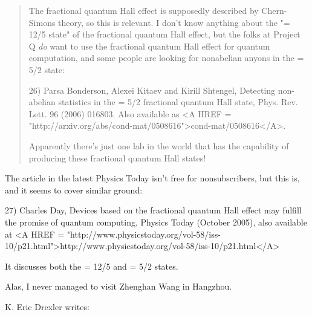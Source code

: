 \begin{quote}
The fractional quantum Hall effect is supposedly described by 
Chern-Simons theory, so this is relevant.   I don't know anything 
about the "\nu  = 12/5 state" of the fractional quantum Hall effect, 
but the folks at Project Q \emph{do} want to use the fractional quantum 
Hall effect for quantum computation, and some people are looking 
for nonabelian anyons in the \nu  = 5/2 state:

26) Parsa Bonderson, Alexei Kitaev and Kirill Shtengel, Detecting
non-abelian statistics in the \nu  = 5/2 fractional quantum Hall
state, Phys. Rev. Lett. 96 (2006) 016803.  Also available as <A HREF =
"http://arxiv.org/abs/cond-mat/0508616">cond-mat/0508616</A>.

Apparently there's just one lab in the world that has the capability
of producing these fractional quantum Hall states!
\end{quote}

The article in the latest Physics Today isn't free for nonsubscribers,
but this is, and it seems to cover similar ground:

27) Charles Day, Devices based on the fractional quantum Hall effect may
fulfill the promise of quantum computing, Physics Today (October 2005),
also available at <A HREF = "http://www.physicstoday.org/vol-58/iss-10/p21.html">http://www.physicstoday.org/vol-58/iss-10/p21.html</A>

It discusses both the \nu  = 12/5 and \nu  = 5/2 states.

Alas, I never managed to visit Zhenghan Wang in Hangzhou.

K. Eric Drexler writes:

